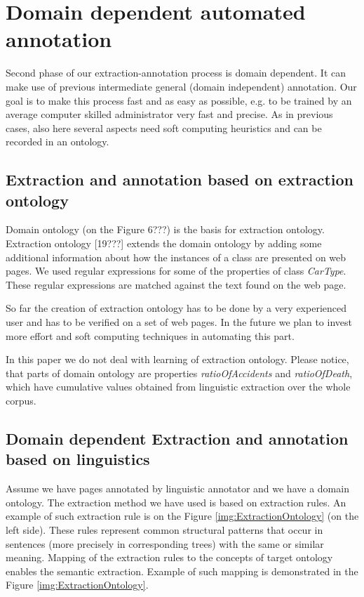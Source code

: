 \documentclass{sig-alternate}
\begin{document}
\section{Domain dependent automated annotation}
Second phase of our extraction-annotation process is domain dependent. It can make use of previous intermediate general (domain independent) annotation. Our goal is to make this process fast and as easy as possible, e.g. to be trained by an average computer skilled administrator very fast and precise. As in previous cases, also here several aspects need soft computing heuristics and can be recorded in an ontology.

\subsection{Extraction and annotation based on extraction ontology}
Domain ontology (on the Figure 6???) is the basis for extraction ontology. Extraction ontology [19???] extends the domain ontology by adding some additional information about how the instances of a class are presented on web pages. We used regular expressions for some of the properties of class \emph{CarType}. These regular expressions are matched against the text found on the web page. 

So far the creation of extraction ontology has to be done by a very experienced user and has to be verified on a set of web pages. In the future we plan to invest more effort and soft computing techniques in automating this part.

In this paper we do not deal with learning of extraction ontology. Please notice, that parts of domain ontology are properties \emph{ratioOfAccidents} and \emph{ratioOfDeath}, which have cumulative values obtained from linguistic extraction over the whole corpus. 

\subsection{Domain dependent Extraction and annotation based on linguistics}

Assume we have pages annotated by linguistic annotator and we have a domain ontology. The extraction method we have used is based on extraction rules. An example of such extraction rule is on the Figure \ref{img:ExtractionOntology} (on the left side). These rules represent common structural patterns that occur in sentences (more precisely in corresponding trees) with the same or similar meaning. Mapping of the extraction rules to the concepts of target ontology enables the semantic extraction. Example of such mapping is demonstrated in the Figure \ref{img:ExtractionOntology}.
\end{document}
